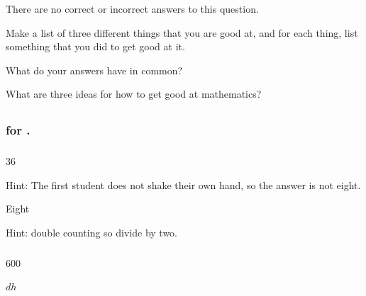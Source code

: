 \begin{exer} [\exerU]%
\label{exer_growth}
    There are no correct or incorrect answers to this question.    
    \begin{exerpart}
        \item Make a list of three different things that you are good at, and for each thing, list something that you did to get good at it.
        \item What do your answers have in common?
        \item What are three ideas for how to get good at mathematics?
    \end{exerpart}
\end{exer}

\subsection{\answers}

\subsubsection{\answers for  \subhs.} 

\subsubsection*{ \answers}
\begin{apart}
    \item 36
    \item Hint: The first student does not shake their own hand, so the answer is not eight.
    \item Eight
    \item Hint: double counting so divide by two.
\end{apart}

\subsubsection*{ \answers}
\begin{apart}
    \item 600
    \item $dh$
\end{apart}


